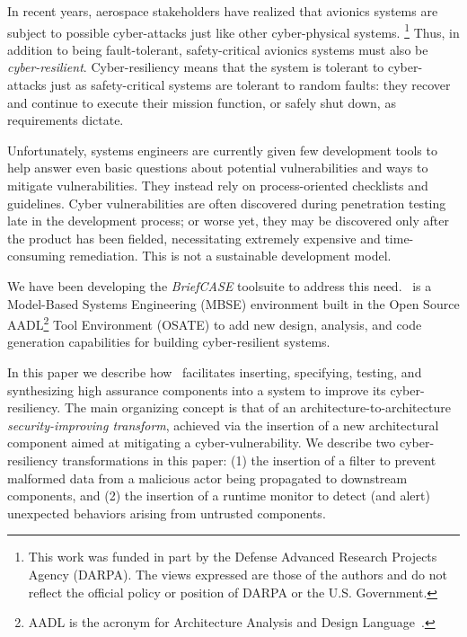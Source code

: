 

In recent years, aerospace stakeholders have realized that avionics
systems are subject to possible cyber-attacks just like other
cyber-physical systems.
%
\footnote{This work was funded in part by the
Defense Advanced Research Projects Agency (DARPA).  The views
expressed are those of the authors and do not reflect the official
policy or position of DARPA or the U.S. Government.}
%
Thus, in addition to being fault-tolerant, safety-critical avionics
systems must also be {\em cyber-resilient}.  Cyber-resiliency means
that the system is tolerant to cyber-attacks just as safety-critical
systems are tolerant to random faults: they recover and continue to
execute their mission function, or safely shut down, as requirements
dictate.

Unfortunately, systems engineers are currently given few development
tools to help answer even basic questions about potential
vulnerabilities and ways to mitigate vulnerabilities.  They instead
rely on process-oriented checklists and guidelines.  Cyber
vulnerabilities are often discovered during penetration testing late
in the development process; or worse yet, they may be discovered only
after the product has been fielded, necessitating extremely expensive
and time-consuming remediation. This is not a sustainable development
model.


We have been developing the {\em BriefCASE} toolsuite to address this need.
\brfcs\ is a Model-Based Systems Engineering (MBSE) environment
built in the Open Source AADL\footnote{AADL is the acronym for
Architecture Analysis and Design Language~\cite{aadl}.}  Tool
Environment (OSATE) to add new design, analysis, and code generation
capabilities for building cyber-resilient systems.

In this paper we describe how \brfcs\ facilitates inserting,
specifying, testing, and synthesizing high assurance components into a
system to improve its cyber-resiliency.  The main organizing concept
is that of an architecture-to-architecture \emph{security-improving
transform}, achieved via the insertion of a new architectural
component aimed at mitigating a cyber-vulnerability.  We describe two
cyber-resiliency transformations in this paper: (1) the insertion of a
filter to prevent malformed data from a malicious actor being
propagated to downstream components, and (2) the insertion of a
runtime monitor to detect (and alert) unexpected behaviors arising
from untrusted components.

